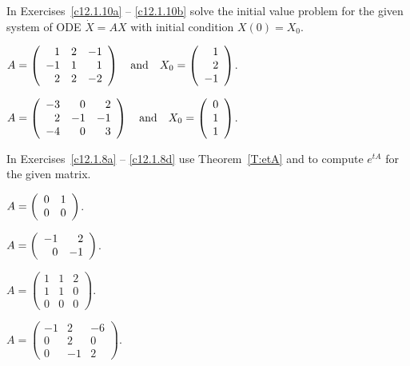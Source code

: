 \noindent  In Exercises~\ref{c12.1.10a} -- \ref{c12.1.10b}  solve the 
initial value problem for the given system of ODE $\dot{X}=AX$ with 
initial condition $X(0)=X_0$.
\begin{exercise}  \label{c12.1.10a}
$A=\left(\begin{array}{rrr} 
     1   &  2  &  -1 \\
    -1   &  1  &   1 \\
     2   &  2  &  -2
\end{array}\right) \quad\mbox{and}\quad 
X_0=\left(\begin{array}{r} 1 \\ 2 \\ -1  \end{array}\right)$.
\end{exercise}
\begin{exercise}  \label{c12.1.10b}
$A=\left(\begin{array}{rrr}
    -3   &  0   &  2\\
     2   & -1   & -1\\
    -4   &  0   &  3
\end{array}\right) \quad\mbox{and}\quad 
X_0=\left(\begin{array}{r} 0 \\ 1 \\ 1  \end{array}\right)$.
\end{exercise}

\noindent  In Exercises~\ref{c12.1.8a} -- \ref{c12.1.8d} use
Theorem~\ref{T:etA} and \Matlab to compute $e^{tA}$ for the given matrix.
\begin{exercise} \label{c12.1.8a}
$A = \left(\begin{array}{rr} 0 & 1\\ 0 &0\end{array}\right)$.
\end{exercise}
\begin{exercise} \label{c12.1.8b}
$A = \left(\begin{array}{rr} -1 & 2\\ 0 &-1\end{array}\right)$.
\end{exercise}
\begin{exercise} \label{c12.1.8c}
$A = \left(\begin{array}{rrr} 1 & 1 & 2\\ 1 & 1 & 0 \\ 0 & 0 & 0
\end{array}\right)$.
\end{exercise}
\begin{exercise} \label{c12.1.8d}
$A = \left(\begin{array}{rrr} -1 & 2 & -6\\ 0 & 2 & 0 \\ 0 & -1 & 2
\end{array}\right)$.
\end{exercise} 


